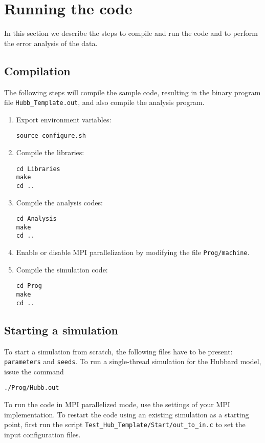 \section{Running the code}\label{sec:io}
In this section we describe the steps to compile and run the code and to perform the error analysis of the data.


\subsection{Compilation}
The following steps will compile the sample code, resulting in the  binary program file \texttt{Hubb\_Template.out}, and also compile the 
analysis program.
\begin{enumerate}
\item Export  environment variables:
\begin{verbatim}
source configure.sh
\end{verbatim}
\item Compile the libraries: 
\begin{verbatim}
cd Libraries
make
cd ..
\end{verbatim}
\item Compile the analysis codes: 
\begin{verbatim}
cd Analysis
make
cd ..
\end{verbatim}
\item 
Enable or disable MPI parallelization by modifying the file \texttt{Prog/machine}.
\item Compile the simulation code:
\begin{verbatim}
cd Prog
make
cd ..
\end{verbatim}
\end{enumerate}


\subsection{Starting a simulation}
To start a simulation from scratch, the following files have to be present: \texttt{parameters} and \texttt{seeds}. 
To run a single-thread simulation for the Hubbard model, issue the command
\begin{verbatim}
./Prog/Hubb.out
\end{verbatim}
To run the code in MPI parallelized mode, use the settings of your MPI implementation. 
To restart the code using an existing simulation as a starting point, first run the script \texttt{Test\_Hub\_Template/Start/out\_to\_in.c} to set 
the input configuration files.

